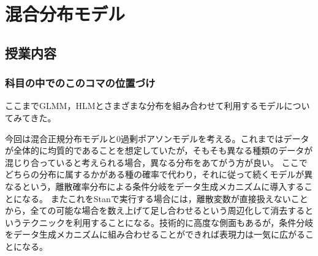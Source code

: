\section{混合分布モデル}
\label{lesson2_26}
\subsection{授業内容}
\subsubsection{科目の中でのこのコマの位置づけ}
ここまでGLMM，HLMとさまざまな分布を組み合わせて利用するモデルについてみてきた。

今回は混合正規分布モデルと0過剰ポアソンモデルを考える。これまではデータが全体的に均質的であることを想定していたが，そもそも異なる種類のデータが混じり合っていると考えられる場合，異なる分布をあてがう方が良い。
ここでどちらの分布に属するかがある種の確率で代わり，それに従って続くモデルが異なるという，離散確率分布による条件分岐をデータ生成メカニズムに導入することになる。
またこれをStanで実行する場合には，離散変数が直接扱えないことから，全ての可能な場合を数え上げて足し合わせるという周辺化して消去するというテクニックを利用することになる。技術的に高度な側面もあるが，条件分岐をデータ生成メカニズムに組み合わせることができれば表現力は一気に広がることになる。
